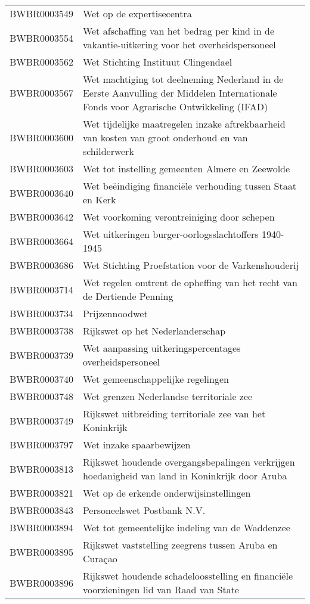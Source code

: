 \begin{longtable}{lp{}}
BWBR0003549 & Wet op de expertisecentra \\
BWBR0003554 & Wet afschaffing van het bedrag per kind in de vakantie-uitkering voor het overheidspersoneel \\
BWBR0003562 & Wet Stichting Instituut Clingendael \\
BWBR0003567 & Wet machtiging tot deelneming Nederland in de Eerste Aanvulling der Middelen Internationale Fonds voor Agrarische Ontwikkeling (IFAD) \\
BWBR0003600 & Wet tijdelijke maatregelen inzake aftrekbaarheid van kosten van groot onderhoud en van schilderwerk \\
BWBR0003603 & Wet tot instelling gemeenten Almere en Zeewolde \\
BWBR0003640 & Wet beëindiging financiële verhouding tussen Staat en Kerk \\
BWBR0003642 & Wet voorkoming verontreiniging door schepen \\
BWBR0003664 & Wet uitkeringen burger-oorlogsslachtoffers 1940-1945 \\
BWBR0003686 & Wet Stichting Proefstation voor de Varkenshouderij \\
BWBR0003714 & Wet regelen omtrent de opheffing van het recht van de Dertiende Penning \\
BWBR0003734 & Prijzennoodwet  \\
BWBR0003738 & Rijkswet op het Nederlanderschap \\
BWBR0003739 & Wet aanpassing uitkeringspercentages overheidspersoneel \\
BWBR0003740 & Wet gemeenschappelijke regelingen \\
BWBR0003748 & Wet grenzen Nederlandse territoriale zee \\
BWBR0003749 & Rijkswet uitbreiding territoriale zee van het Koninkrijk \\
BWBR0003797 & Wet inzake spaarbewijzen \\
BWBR0003813 & Rijkswet houdende overgangsbepalingen verkrijgen hoedanigheid van land in Koninkrijk door Aruba \\
BWBR0003821 & Wet op de erkende onderwijsinstellingen \\
BWBR0003843 & Personeelswet Postbank N.V. \\
BWBR0003894 & Wet tot gemeentelijke indeling van de Waddenzee \\
BWBR0003895 & Rijkswet vaststelling zeegrens tussen Aruba en Curaçao \\
BWBR0003896 & Rijkswet houdende schadeloosstelling en financiële voorzieningen lid van Raad van State \\

\end{longtable}
